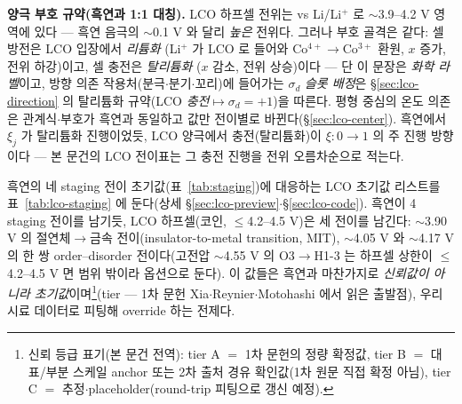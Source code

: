 \documentclass[11pt,a4paper]{article}
\begin{document}
\textbf{양극 부호 규약(흑연과 1:1 대칭).} LCO 하프셀 전위는 vs Li/Li$^+$ 로 $\sim$3.9--4.2 V 영역에 있다 — 흑연 음극의
$\sim$0.1 V 와 달리 \emph{높은} 전위다. 그러나 부호 골격은 같다: 셀 방전은 LCO 입장에서 \emph{리튬화}
(Li$^+$ 가 LCO 로 들어와 Co$^{4+}\!\to$Co$^{3+}$ 환원, $x$ 증가, 전위 하강)이고, 셀 충전은 \emph{탈리튬화}
($x$ 감소, 전위 상승)이다 — 단 이 문장은 \emph{화학 라벨}이고, 방향 의존 작용처(분극$\cdot$분기$\cdot$꼬리)에 들어가는
$\sigma_d$ \emph{슬롯 배정}은 \S\ref{sec:lco-direction} 의 탈리튬화 규약(LCO \emph{충전}$\mapsto\sigma_d{=}+1$)을
따른다. 평형 중심의 온도 의존은 관계식$\cdot$부호가 흑연과 동일하고 값만 전이별로 바뀐다(\S\ref{sec:lco-center}).
흑연에서 $\xi_j$ 가 탈리튬화 진행이었듯, LCO 양극에서 충전(탈리튬화)이 $\xi:0\!\to\!1$ 의 주 진행 방향이다 — 본 문건의
LCO 전이표는 그 충전 진행을 전위 오름차순으로 적는다.

흑연의 네 staging 전이 초기값(표~\ref{tab:staging})에 대응하는 LCO 초기값 리스트를 표~\ref{tab:lco-staging}
에 둔다(상세 \S\ref{sec:lco-preview}$\cdot$\S\ref{sec:lco-code}). 흑연이 4 staging 전이를 남기듯, LCO
하프셀(코인, $\le$4.2--4.5 V)은 세 전이를 남긴다\cite{xia2007}: $\sim$3.90 V 의 절연체$\to$금속 전이(insulator-to-metal transition, MIT), $\sim$4.05 V 와
$\sim$4.17 V 의 한 쌍 order--disorder 전이다(고전압 $\sim$4.55 V 의 O3$\to$H1-3 는 하프셀 상한이 $\le$4.2--4.5 V 면
범위 밖이라 옵션으로 둔다). 이 값들은 흑연과 마찬가지로 \emph{신뢰값이 아니라 초기값}이며\footnote{신뢰
등급 표기(본 문건 전역): tier A $=$ 1차 문헌의 정량 확정값, tier B $=$ 대표/부분 스케일 anchor 또는
2차 출처 경유 확인값(1차 원문 직접 확정 아님), tier C $=$ 추정$\cdot$placeholder(round-trip 피팅으로
갱신 예정).}(tier — 1차 문헌
Xia\cite{xia2007}$\cdot$Reynier\cite{reynier2004}$\cdot$Motohashi\cite{motohashi2009} 에서 읽은 출발점), 우리 시료 데이터로
피팅해 override 하는 전제다.
\end{document}
